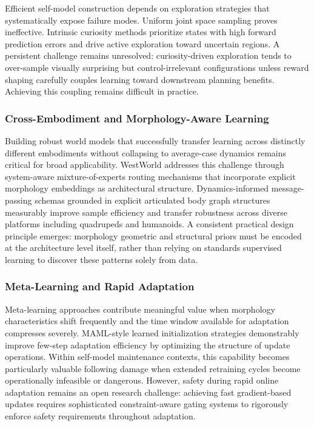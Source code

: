 ﻿\documentclass[11pt,a4paper]{article}
\begin{document}
Efficient self-model construction depends on exploration strategies that systematically expose failure modes. Uniform joint space sampling proves ineffective. Intrinsic curiosity methods prioritize states with high forward prediction errors and drive active exploration toward uncertain regions. A persistent challenge remains unresolved: curiosity-driven exploration tends to over-sample visually surprising but control-irrelevant configurations unless reward shaping carefully couples learning toward downstream planning benefits. Achieving this coupling remains difficult in practice.

\subsubsection{Cross-Embodiment and Morphology-Aware Learning}

Building robust world models that successfully transfer learning across distinctly different embodiments without collapsing to average-case dynamics remains critical for broad applicability. WestWorld \cite{wang2026westworld} addresses this challenge through system-aware mixture-of-experts routing mechanisms that incorporate explicit morphology embeddings as architectural structure. Dynamics-informed message-passing schemas grounded in explicit articulated body graph structures measurably improve sample efficiency and transfer robustness across diverse platforms including quadrupeds and humanoids. A consistent practical design principle emerges: morphology geometric and structural priors must be encoded at the architecture level itself, rather than relying on standards supervised learning to discover these patterns solely from data.

\subsubsection{Meta-Learning and Rapid Adaptation}

Meta-learning approaches contribute meaningful value when morphology characteristics shift frequently and the time window available for adaptation compresses severely. MAML-style learned initialization strategies demonstrably improve few-step adaptation efficiency by optimizing the structure of update operations. Within self-model maintenance contexts, this capability becomes particularly valuable following damage when extended retraining cycles become operationally infeasible or dangerous. However, safety during rapid online adaptation remains an open research challenge: achieving fast gradient-based updates requires sophisticated constraint-aware gating systems to rigorously enforce safety requirements throughout adaptation.
\end{document}
